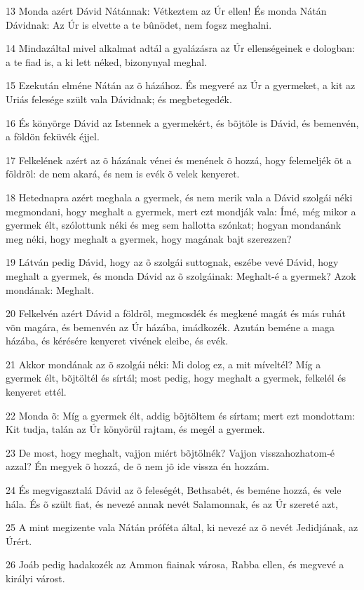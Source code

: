 \par 13 Monda azért Dávid Nátánnak: Vétkeztem az Úr ellen! És monda Nátán Dávidnak: Az Úr is elvette a te bûnödet, nem fogsz meghalni.
\par 14 Mindazáltal mivel alkalmat adtál a gyalázásra az Úr ellenségeinek e dologban: a te fiad is, a ki lett néked, bizonynyal meghal.
\par 15 Ezekután elméne Nátán az õ házához. És megveré az Úr a gyermeket, a kit az Uriás felesége szült vala Dávidnak; és megbetegedék.
\par 16 És könyörge Dávid az Istennek a gyermekért, és bõjtöle is Dávid, és bemenvén, a földön feküvék éjjel.
\par 17 Felkelének azért az õ házának vénei és menének õ hozzá, hogy felemeljék õt a földrõl: de nem akará, és nem is evék õ velek kenyeret.
\par 18 Hetednapra azért meghala a gyermek, és nem merik vala a Dávid szolgái néki megmondani, hogy meghalt a gyermek, mert ezt mondják vala: Ímé, még mikor a gyermek élt, szólottunk néki és meg sem hallotta szónkat; hogyan mondanánk meg néki, hogy meghalt a gyermek, hogy magának bajt szerezzen?
\par 19 Látván pedig Dávid, hogy az õ szolgái suttognak, eszébe vevé Dávid, hogy meghalt a gyermek, és monda Dávid az õ szolgáinak: Meghalt-é a gyermek? Azok mondának: Meghalt.
\par 20 Felkelvén azért Dávid a földrõl, megmosdék és megkené magát és más ruhát võn magára, és bemenvén az Úr házába, imádkozék. Azután beméne a maga házába, és kérésére kenyeret vivének eleibe, és evék.
\par 21 Akkor mondának az õ szolgái néki: Mi dolog ez, a mit míveltél? Míg a gyermek élt, bõjtöltél és sírtál; most pedig, hogy meghalt a gyermek, felkelél és kenyeret ettél.
\par 22 Monda õ: Míg a gyermek élt, addig bõjtöltem és sírtam; mert ezt mondottam: Kit tudja, talán az Úr könyörül rajtam, és megél a gyermek.
\par 23 De most, hogy meghalt, vajjon miért bõjtölnék? Vajjon visszahozhatom-é azzal? Én megyek õ hozzá, de õ nem jõ ide vissza én hozzám.
\par 24 És megvigasztalá Dávid az õ feleségét, Bethsabét, és beméne hozzá, és vele hála. És õ szült fiat, és nevezé annak nevét Salamonnak, és az Úr szereté azt,
\par 25 A mint megizente vala Nátán próféta által, ki nevezé az õ nevét Jedidjának, az Úrért.
\par 26 Joáb pedig hadakozék az Ammon fiainak városa, Rabba ellen, és megvevé a királyi várost.
